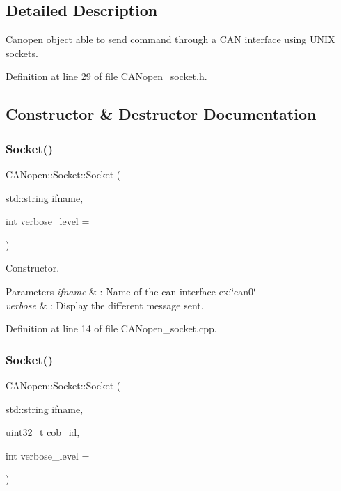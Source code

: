 \subsection{Detailed Description}
Canopen object able to send command through a C\+AN interface using U\+N\+IX sockets. 

Definition at line 29 of file C\+A\+Nopen\+\_\+socket.\+h.



\subsection{Constructor \& Destructor Documentation}
\mbox{\label{class_c_a_nopen_1_1_socket_a66c37f6819a5ad8829326380812446e6}} 
\subsubsection{\texorpdfstring{Socket()}{Socket()}\hspace{0.1cm}{\footnotesize\ttfamily [1/2]}}
{\footnotesize\ttfamily C\+A\+Nopen\+::\+Socket\+::\+Socket (\begin{DoxyParamCaption}\item[{std\+::string}]{ifname,  }\item[{int}]{verbose\+\_\+level = {} }\end{DoxyParamCaption})}



Constructor. 


\begin{DoxyParams}{Parameters}
{\em ifname} & \+: Name of the can interface ex\+:\char`\"{}can0\char`\"{} \\
\hline
{\em verbose} & \+: Display the different message sent. \\
\hline
\end{DoxyParams}


Definition at line 14 of file C\+A\+Nopen\+\_\+socket.\+cpp.

\mbox{\label{class_c_a_nopen_1_1_socket_af234eea5568f8f436cb815ab70e75f2f}} 
\subsubsection{\texorpdfstring{Socket()}{Socket()}\hspace{0.1cm}{\footnotesize\ttfamily [2/2]}}
{\footnotesize\ttfamily C\+A\+Nopen\+::\+Socket\+::\+Socket (\begin{DoxyParamCaption}\item[{std\+::string}]{ifname,  }\item[{uint32\+\_\+t}]{cob\+\_\+id,  }\item[{int}]{verbose\+\_\+level = {} }\end{DoxyParamCaption})}



